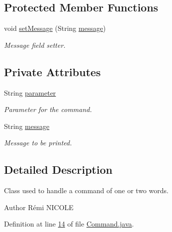 \subsection*{Protected Member Functions}
\begin{DoxyCompactItemize}
\item 
void \hyperlink{classpkg__commands_1_1Command_ae210ff216fe908b111ba1c988a963d13}{set\-Message} (String \hyperlink{classpkg__commands_1_1Command_ab4bc9d76fd948fcf253400793fbfde3f}{message})
\begin{DoxyCompactList}\small\item\em Message field setter. \end{DoxyCompactList}\end{DoxyCompactItemize}
\subsection*{Private Attributes}
\begin{DoxyCompactItemize}
\item 
String \hyperlink{classpkg__commands_1_1Command_a089fe1b30b43b2ad5f0dcb2f0ffc2fdd}{parameter}
\begin{DoxyCompactList}\small\item\em Parameter for the command. \end{DoxyCompactList}\item 
String \hyperlink{classpkg__commands_1_1Command_ab4bc9d76fd948fcf253400793fbfde3f}{message}
\begin{DoxyCompactList}\small\item\em Message to be printed. \end{DoxyCompactList}\end{DoxyCompactItemize}


\subsection{Detailed Description}
Class used to handle a command of one or two words. 

\begin{DoxyAuthor}{Author}
Rémi N\-I\-C\-O\-L\-E 
\end{DoxyAuthor}


Definition at line \hyperlink{Command_8java_source_l00014}{14} of file \hyperlink{Command_8java_source}{Command.\-java}.



